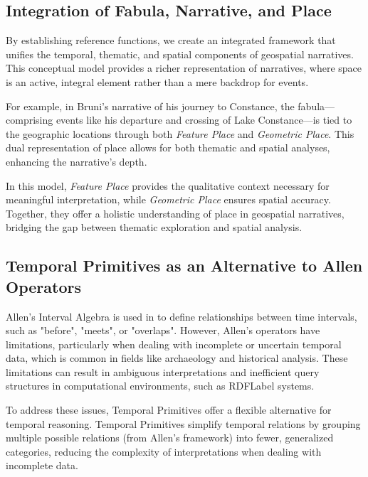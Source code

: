 \subsection{Integration of Fabula, Narrative, and Place}\label{V-subsec:integrationFabulaNarrativePlace}

By establishing reference functions, we create an integrated framework that unifies the temporal, thematic, and spatial components of geospatial narratives. This conceptual model provides a richer representation of narratives, where space is an active, integral element rather than a mere backdrop for events.

For example, in Bruni’s narrative of his journey to Constance, the fabula—comprising events like his departure and crossing of Lake Constance—is tied to the geographic locations through both \textit{Feature Place} and \textit{Geometric Place}. This dual representation of place allows for both thematic and spatial analyses, enhancing the narrative’s depth.

In this model, \textit{Feature Place} provides the qualitative context necessary for meaningful interpretation, while \textit{Geometric Place} ensures spatial accuracy. Together, they offer a holistic understanding of place in geospatial narratives, bridging the gap between thematic exploration and spatial analysis.

\subsection{Temporal Primitives as an Alternative to Allen Operators}\label{V-subsec:temporalPrimitives}

Allen's Interval Algebra \cite{allenMaintainingKnowledgeTemporal1983} is used in \cite{meghiniRepresentingNarrativesDigital2021} to define relationships between time intervals, such as "before", "meets", or "overlaps". However, Allen's operators have limitations, particularly when dealing with incomplete or uncertain temporal data, which is common in fields like archaeology and historical analysis. These limitations can result in ambiguous interpretations and inefficient query structures in computational environments, such as \acrshort{RDFLabel} systems.

To address these issues, Temporal Primitives \cite{papadakisTemporalPrimitivesAlternative2015} offer a flexible alternative for temporal reasoning. Temporal Primitives simplify temporal relations by grouping multiple possible relations (from Allen’s framework) into fewer, generalized categories, reducing the complexity of interpretations when dealing with incomplete data. 

